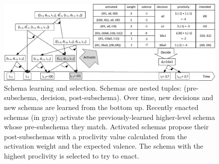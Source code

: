\documentclass[runningheads]{llncs}
\begin{document}
\begin{figure}
	\centering
	\includegraphics[width=1.0\textwidth]{Figure_3_agent8.pdf}
	\caption{Schema learning and selection.
		Schemas are nested tuples: (pre-subschema, decision, post-subschema).
		Over time, new decisions and new schemas are learned from the bottom up. 
		Recently enacted schemas (in gray) activate the previously-learned higher-level schema whose pre-subschema they match.
		Activated schemas propose their post-subschemas with a proclivity value calculated from the activation weight and the expected valence.
		The schema with the highest proclivity is selected to try to enact.} 
	\label{fig:agent8}
\end{figure}



\end{document}
